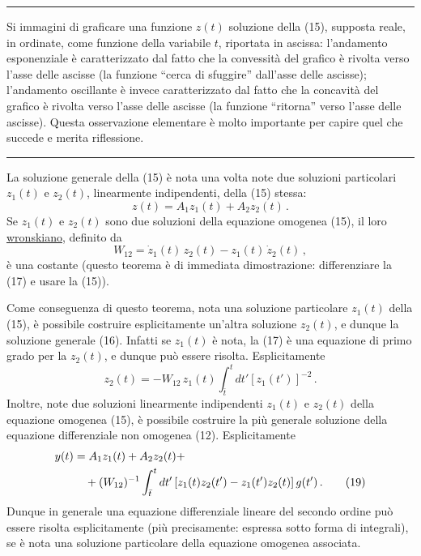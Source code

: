 \documentclass[11pt, a4paper]{book}
\numberwithin{equation}{section}
\begin{document}
\noindent\rule{\textwidth}{0.4pt}
\begin{small}
Si immagini di graficare una funzione $z(t)$ soluzione della (15), supposta
reale, in ordinate, come funzione della variabile $t$, riportata in ascissa:
l'andamento esponenziale è caratterizzato dal fatto che la convessità del
grafico è rivolta verso l'asse delle ascisse (la funzione ``cerca di sfuggire''
dall'asse delle ascisse); l'andamento oscillante è invece caratterizzato dal
fatto che la concavità del grafico è rivolta verso l'asse delle ascisse (la
funzione ``ritorna'' verso l'asse delle ascisse). Questa osservazione elementare
è molto importante per capire quel che succede e merita riflessione.
\end{small}
\noindent\rule{\textwidth}{0.4pt}

La soluzione generale della (15) è nota una volta note due soluzioni particolari
$z_1(t)$ e $z_2(t)$, linearmente indipendenti, della (15) stessa:
\begin{equation}
    z(t) = A_1 z_1(t) + A_2 z_2(t) \,. \tag{16}
\end{equation}
Se $z_1(t)$ e $z_2(t)$ sono due soluzioni della equazione omogenea (15), il loro
\underline{wronskiano}, definito da
\begin{equation}
    W_{12} = \dot{z}_1(t) \, z_2(t) - z_1(t) \, \dot{z}_2(t) \,, \tag{17}
\end{equation}
è una costante (questo teorema è di immediata dimostrazione: differenziare la
(17) e usare la (15)).

Come conseguenza di questo teorema, nota una soluzione particolare $z_1(t)$
della (15), è possibile costruire esplicitamente un'altra soluzione $z_2(t)$, e
dunque la soluzione generale (16). Infatti se $z_1(t)$ è nota, la (17) è una
equazione di primo grado per la $z_2(t)$, e dunque può essere risolta.
Esplicitamente
\begin{equation}
    z_2(t) = -W_{12} \, z_1(t) \int_{\bar{t}}^{t} dt' \left[ z_1(t') \right]^{-2} \,. \tag{18}
\end{equation}
Inoltre, note due soluzioni linearmente indipendenti $z_1(t)$ e $z_2(t)$ della
equazione omogenea (15), è possibile costruire la più generale soluzione della
equazione differenziale non omogenea (12). Esplicitamente
\begin{align}
    y(t) &= A_1 z_1(t) + A_2 z_2(t) + \notag \\
    &\quad + (W_{12})^{-1} \int_{\bar{t}}^{t} dt' \left[ z_1(t) z_2(t') - z_1(t') z_2(t) \right] g(t') \,. \tag{19}
\end{align}
Dunque in generale una equazione differenziale lineare del secondo ordine può
essere risolta esplicitamente (più precisamente: espressa sotto forma di
integrali), se è nota una soluzione particolare della equazione omogenea
associata.
\end{document}
